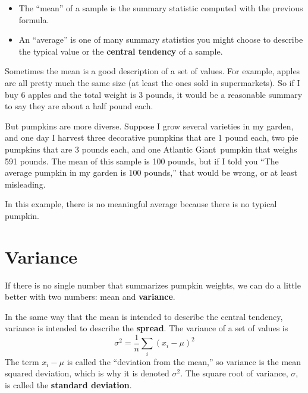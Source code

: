 \documentclass[12pt]{book}
\begin{document}
\begin{itemize}

\item The ``mean'' of a sample is the summary statistic computed with
  the previous formula.

\item An ``average'' is one of many summary statistics you might
  choose to describe the typical value or the
  {\bf central tendency} of a sample.


\end{itemize}

Sometimes the mean is a good description of a set of values.  For
example, apples are all pretty much the same size (at least the ones
sold in supermarkets).  So if I buy 6 apples and the total weight is 3
pounds, it would be a reasonable summary to say they are about a half
pound each.


But pumpkins are more diverse.  Suppose I grow several varieties in my
garden, and one day I harvest three decorative pumpkins that are 1
pound each, two pie pumpkins that are 3 pounds each, and one Atlantic
Giant\textregistered~pumpkin that weighs 591 pounds.  The mean of
this sample is 100 pounds, but if I told you ``The average pumpkin
in my garden is 100 pounds,'' that would be wrong, or at least
misleading.


In this example, there is no meaningful average because
there is no typical pumpkin.

\section{Variance}

If there is no single number that summarizes pumpkin weights,
we can do a little better with two numbers: mean and {\bf variance}.

In the same way that the mean is intended to describe the central
tendency, variance is intended to describe the {\bf spread}.
The variance of a set of values is
%
\[ \sigma^2 = \frac{1}{n} \sum_i (x_i - \mu)^2 \]
%
The term $x_i - \mu$ is called the ``deviation from the mean,'' so
variance is the mean squared deviation, which is why it is denoted
$\sigma^2$.  The square root of variance, $\sigma$, is called the {\bf
  standard deviation}.

\end{document}
